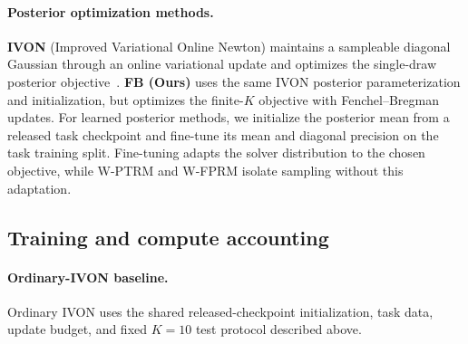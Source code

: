 \paragraph{Posterior optimization methods.}
\textbf{IVON} (Improved Variational Online Newton) maintains a sampleable
diagonal Gaussian through an online variational update and optimizes the
single-draw posterior objective~\citep{shen2024variational}. \textbf{FB
(Ours)} uses the same IVON posterior parameterization and initialization, but
optimizes the finite-$K$ objective with Fenchel--Bregman updates. For learned
posterior methods, we initialize the posterior mean from a released task
checkpoint and fine-tune its mean and diagonal precision on the task training
split. Fine-tuning adapts the solver distribution to the chosen objective,
while W-PTRM and W-FPRM isolate sampling without this adaptation.

\subsection{Training and compute accounting}


\paragraph{Ordinary-IVON baseline.}
Ordinary IVON uses the shared released-checkpoint initialization, task data,
update budget, and fixed $K=10$ test protocol described above.
